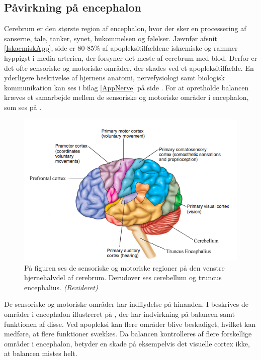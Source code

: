 \subsection{Påvirkning på encephalon}\label{HjerneSenMot}
Cerebrum er den største region af encephalon, hvor der sker en processering af sanserne, tale, tanker, synet, hukommelsen og følelser. \cite{Martini2012} Jævnfør afsnit \ref{IskaemiskApp}, side \pageref{IskaemiskApp} er $80$-$85\%$ af apopleksitilfældene iskæmiske og rammer hyppigst i media arterien, der forsyner det meste af cerebrum med blod. Derfor er det ofte sensoriske og motoriske områder, der skades ved et apopleksitilfælde. \cite{Sundhed.dk2014,Kruuse2015a,Gade2004,Boss2010} En yderligere beskrivelse af hjernens anatomi, nervefysiologi samt biologisk kommunikation kan ses i bilag \ref{AppNerve} på side \pageref{AppNerve}. For at opretholde balancen kræves et samarbejde mellem de sensoriske og motoriske områder i encephalon, som ses på .

\begin{figure}[H]
	\centering
	\includegraphics[scale=0.8]{figures/bProblemanalyse/Encephalon3.png}
	\caption{På figuren ses de sensoriske og motoriske regioner på den venstre hjernehalvdel af cerebrum. Derudover ses cerebellum og truncus encephalius. \textit{(Revideret)} \cite{Stanfield2014}}
	\label{Enc}
\end{figure}

\noindent De sensoriske og motoriske områder har indflydelse på hinanden. I  beskrives de områder i encephalon illustreret på , der har indvirkning på balancen samt funktionen af disse. Ved apopleksi kan flere områder blive beskadiget, hvilket kan medføre, at flere funktioner svækkes. Da balancen kontrolleres af flere forskellige områder i encephalon, betyder en skade på eksempelvis det visuelle cortex ikke, at balancen mistes helt. 

